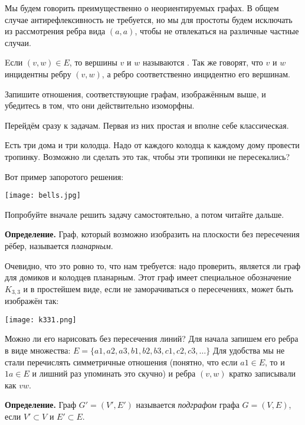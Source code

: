 Мы будем говорить преимущественно о неориентируемых графах. В общем случае антирефлексивность не требуется, но мы для простоты будем исключать из рассмотрения ребра вида $(a, a)$, чтобы не отвлекаться на различные частные случаи.

\begin{definition}
Eсли $(v, w) \in E$, то вершины $v$ и $w$ называются . Так же говорят, что $v$ и $w$ инцидентны ребру $(v, w)$, а ребро соответственно инцидентно его вершинам.
\end{definition}

\begin{exercise}
	Запишите отношения, соответствующие графам, изображённым выше, и убедитесь в том, что они действительно изоморфны.
\end{exercise}

Перейдём сразу к задачам. Первая из них простая и вполне себе классическая.

\begin{problem}
Есть три дома и три колодца. Надо от каждого колодца к каждому дому провести тропинку. Возможно ли сделать это так, чтобы эти тропинки не пересекались?
\end{problem}

Вот пример запоротого решения:

\texttt{[image: bells.jpg]}

Попробуйте вначале решить задачу самостоятельно, а потом читайте дальше.

{\bfseries Определение.} Граф, который возможно изобразить на плоскости без пересечения рёбер, называется {\slshape планарным}.

Очевидно, что это ровно то, что нам требуется: надо проверить, является ли граф для домиков и колодцев планарным. Этот граф имеет специальное обозначение $K_{3, 3}$ и в простейшем виде, если не заморачиваться о пересечениях, может быть изображён так:

\texttt{[image: k331.png]}

Можно ли его нарисовать без пересечения линий? Для начала запишем его ребра в виде множества: $E = \{a1, a2, a3, b1, b2, b3, c1, c2, c3, \ldots\}$ Для удобства мы не стали перечислять симметричные отношения (понятно, что если $a1\in E$, то и $1a \in E$ и лишний раз упоминать это скучно) и ребра $(v, w)$ кратко записывали как $vw$.

{\bfseries Определение.} Граф $G' = (V', E')$ называется {\slshape подграфом} графа $G = (V, E)$, если $V' \subset V$ и $E' \subset E$.

